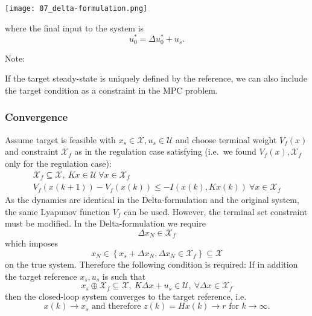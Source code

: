 \begin{center}
    \texttt{[image: 07\_delta-formulation.png]}
\end{center}

where the final input to the system is
\begin{equation*}
    u_0^* = \Delta u_0^* + u_s.
\end{equation*}

Note:

If the target steady-state is uniquely defined by the reference, we can also include the target condition as a constraint in the MPC problem.

\subsubsection{Convergence}

Assume target is feasible with $x_s \in \mathcal{X}, u_s \in \mathcal{U}$ and choose terminal weight $V_f(x)$ and constraint $\mathcal{X}_f$ as in the regulation case satisfying (i.e.\ we found $V_f(x), \mathcal{X}_f$ only for the regulation case):
\begin{gather*}
    \mathcal{X}_f \subseteq \mathcal{X}, \: Kx \in \mathcal{U} \: \forall x \in \mathcal{X}_f \\
    V_f(x(k+1)) - V_f(x(k)) \leq -I(x(k),Kx(k)) \: \forall x \in \mathcal{X}_f
\end{gather*}
\newpar{}
As the dynamics are identical in the Delta-formulation and the original system, the same Lyapunov function $V_f$ can be used.
\newpar{}
However, the terminal set constraint must be modified. In the Delta-formulation we require
\begin{equation*}
    \Delta x_N \in \mathcal{X}_f
\end{equation*}
which imposes
\begin{equation*}
    x_N \in \left\{x_s + \Delta x_N, \Delta x_N \in \mathcal{X}_f\right\} \subseteq \mathcal{X}
\end{equation*}
on the true system. Therefore the following condition is required: If in addition the target reference $x_s, u_s$ is such that
\begin{equation*}
    x_s \oplus \mathcal{X}_f \subseteq \mathcal{X}, \: K\Delta x + u_s \in \mathcal{U}, \: \forall \Delta x \in \mathcal{X}_f
\end{equation*}
then the closed-loop system converges to the target reference, i.e.
\begin{equation*}
    x(k) \to x_s \text{ and therefore } z(k) = Hx(k) \to r \text{ for } k \to \infty.
\end{equation*}

